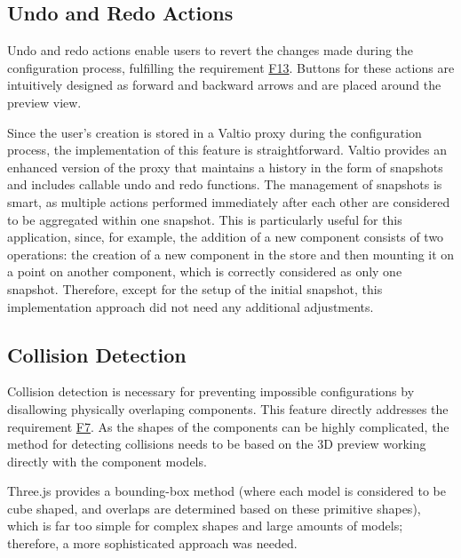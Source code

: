 \subsection{Undo and Redo Actions}

Undo and redo actions enable users to revert the changes made during the configuration process, fulfilling the requirement \hyperref[itm:F13]{F13}. Buttons for these actions are intuitively designed as forward and backward arrows and are placed around the preview view.

Since the user's creation is stored in a Valtio proxy during the configuration process, the implementation of this feature is straightforward. Valtio provides an enhanced version of the proxy that maintains a history in the form of snapshots and includes callable undo and redo functions. The management of snapshots is smart, as multiple actions performed immediately after each other are considered to be aggregated within one snapshot. This is particularly useful for this application, since, for example, the addition of a new component consists of two operations: the creation of a new component in the store and then mounting it on a point on another component, which is correctly considered as only one snapshot. Therefore, except for the setup of the initial snapshot, this implementation approach did not need any additional adjustments.


\subsection{Collision Detection}

Collision detection is necessary for preventing impossible configurations by disallowing physically overlaping components. This feature directly addresses the requirement \hyperref[itm:F7]{F7}. As the shapes of the components can be highly complicated, the method for detecting collisions needs to be based on the 3D preview working directly with the component models.

Three.js provides a bounding-box method (where each model is considered to be cube shaped, and overlaps are determined based on these primitive shapes), which is far too simple for complex shapes and large amounts of models; therefore, a more sophisticated approach was needed. 

